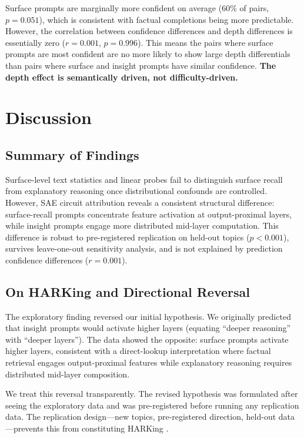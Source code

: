 \documentclass{article}
\begin{document}
Surface prompts are marginally more confident on average (60\% of pairs, $p = 0.051$), 
which is consistent with factual completions being more predictable. However, the correlation 
between confidence differences and depth differences is essentially zero ($r = 0.001$, 
$p = 0.996$). This means the pairs where surface prompts are most confident are no more 
likely to show large depth differentials than pairs where surface and insight prompts have 
similar confidence. \textbf{The depth effect is semantically driven, not difficulty-driven.}

\section{Discussion}

\subsection{Summary of Findings}

Surface-level text statistics and linear probes fail to distinguish surface recall from 
explanatory reasoning once distributional confounds are controlled. However, SAE circuit 
attribution reveals a consistent structural difference: surface-recall prompts concentrate 
feature activation at output-proximal layers, while insight prompts engage more distributed 
mid-layer computation. This difference is robust to pre-registered replication on held-out 
topics ($p < 0.001$), survives leave-one-out sensitivity analysis, and is not explained by 
prediction confidence differences ($r = 0.001$).

\subsection{On HARKing and Directional Reversal}

The exploratory finding reversed our initial hypothesis. We originally predicted that insight 
prompts would activate higher layers (equating ``deeper reasoning'' with ``deeper layers''). 
The data showed the opposite: surface prompts activate higher layers, consistent with a 
direct-lookup interpretation where factual retrieval engages output-proximal features while 
explanatory reasoning requires distributed mid-layer composition.

We treat this reversal transparently. The revised hypothesis was formulated after seeing 
the exploratory data and was pre-registered before running any replication data. 
The replication design---new topics, pre-registered direction, held-out data---prevents this 
from constituting HARKing \citep{kerr1998}.
\end{document}
